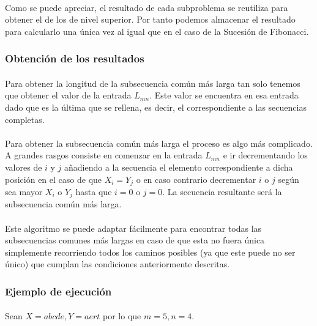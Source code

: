 \documentclass{article}
\begin{document}
			\paragraph{}
			Como se puede apreciar, el resultado  de cada subproblema se reutiliza para obtener el de los de nivel superior. Por tanto podemos almacenar el resultado para calcularlo una única vez al igual que en el caso de la Sucesión de Fibonacci.

		\subsubsection{Obtención de los resultados}
		
			\paragraph{}
			Para obtener la longitud de la subsecuencia común más larga tan solo tenemos que obtener el valor de la entrada $L_{mn}$. Este valor se encuentra en esa entrada dado que es la última que se rellena, es decir, el correspondiente a las secuencias completas.

			\paragraph{}
			Para obtener la subsecuencia común más larga el proceso es algo más complicado. A grandes rasgos consiste en comenzar en la entrada $L_{mn}$ e ir decrementando los valores de $i$ y $j$ añadiendo a la secuencia el elemento correspondiente a dicha posición en el caso de que $ X_{i} = Y_{j}$ o en caso contrario decrementar $i$ o $j$ según sea mayor $X_{i}$ o  $Y_{j}$ hasta que $i = 0$ o $j = 0$. La secuencia resultante será la subsecuencia común más larga.

			\paragraph{}
			Este algoritmo se puede adaptar fácilmente para encontrar todas las subsecuencias comunes más largas en caso de que esta no fuera única simplemente recorriendo todos los caminos posibles (ya que este puede no ser único) que cumplan las condiciones anteriormente descritas.

		\subsubsection{Ejemplo de ejecución}

			\paragraph{}
			Sean $X = abcde, Y = aert $ por lo que $m = 5, n = 4$.
\end{document}
